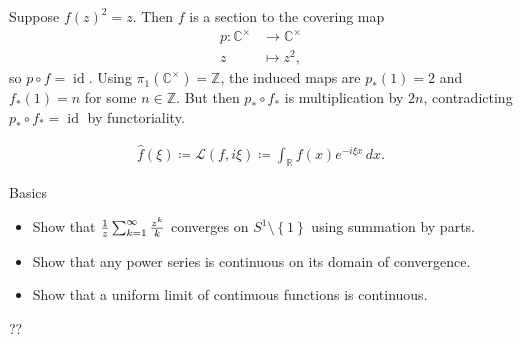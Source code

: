 \begin{solution}

Suppose \(f(z)^2 = z\). Then \(f\) is a section to the covering map
\begin{align*}
p: {\mathbb{C}}^{\times}&\to {\mathbb{C}}^{\times}\\
z & \mapsto z^2
,\end{align*}
so \(p\circ f = \operatorname{id}\). Using
\(\pi_1({\mathbb{C}}^{\times}) = {\mathbb{Z}}\), the induced maps are
\(p_*(1) = 2\) and \(f_*(1) = n\) for some \(n\in {\mathbb{Z}}\). But
then \(p_* \circ f_*\) is multiplication by \(2n\), contradicting
\(p_* \circ f_* = \operatorname{id}\) by functoriality.

\end{solution}

\begin{remark}

\begin{align*}
\widehat{f}(\xi) \coloneqq{\mathcal{L}}(f, i\xi) \coloneqq\int_{\mathbb{R}}f(x) e^{-i\xi x} \,dx
.\end{align*}

\end{remark}

Basics

\begin{itemize}
\tightlist
\item
  Show that \({1\over z} \sum_{k=1}^\infty {z^k \over k}\) converges on
  \(S^1 \setminus\left\{{1}\right\}\) using summation by parts.
\item
  Show that any power series is continuous on its domain of convergence.
\item
  Show that a uniform limit of continuous functions is continuous.
\end{itemize}

??

